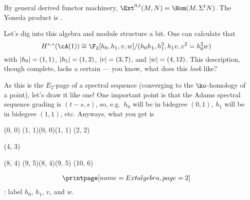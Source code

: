 \begin{rem}[s = 0]
By general derived functor machinery, $\Ext^{0,t}(M, N) = \Hom(M, \Sigma^t N)$. The Yoneda product is \TODO.
\end{rem}

Let's dig into this algebra and module structure a bit. One can calculate that
\begin{equation}
	H^{*,*}(\cA(1)) \cong\F_2[h_0, h_1, v, w]/(h_0h_1, h_1^3, h_1v, v^2 = h_0^2w)
\end{equation}
with $\lvert h_0\rvert = (1, 1)$, $\lvert h_1\rvert = (1, 2)$, $\lvert v\rvert = (3, 7)$, and $\lvert w\rvert = (4, 12)$. This description,
though complete, lacks a certain --- you know, what does this \emph{look} like?

As this is the $E_2$-page of a spectral sequence (converging to the $\ko$-homology of a point), let's draw it like
one! One important point is that the Adams spectral sequence grading is $(t-s, s)$, so, e.g.\ $h_0$ will be in
bidegree $(0, 1)$, $h_1$ will be in bidegree $(1, 1)$, etc. Anyways, what you get is
\begin{sseqdata}[name=Extalgebra, classes=fill, scale=0.5, xrange={0}{10}, yrange={0}{6}]
\class(0, 0)\AdamsTower{}
\class(1, 1)\structline(0, 0)(1, 1)
\class(2, 2)\structline

\class(4, 3)\AdamsTower{}

\class(8, 4)\AdamsTower{}
\class(9, 5)\structline(8, 4)(9, 5)
\class(10, 6)\structline
\end{sseqdata}
\begin{equation}
\begin{gathered}
	\printpage[name=Extalgebra, page=2]
\end{gathered}
\end{equation}
\TODO: label $h_0$, $h_1$, $v$, and $w$.

